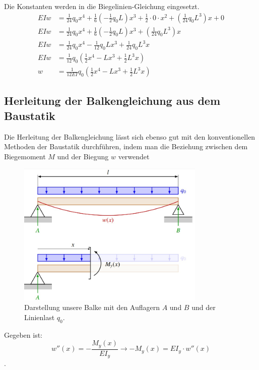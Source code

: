 Die Konstanten werden in die Biegelinien-Gleichung eingesetzt.
\begin{align}
	EIw&=
	\frac{1}{24}q_0x^4+\frac{1}{6}\left(-\frac{1}{2}q_0L\right)x^3+\frac{1}{2}\cdot0\cdot x^2+\left(\frac{1}{24}q_0L^3\right)x+0
  \\
	EIw&=
	\frac{1}{24}q_0x^4+\frac{1}{6}\left(-\frac{1}{2}q_0L\right)x^3+\left(\frac{1}{24}q_0L^3\right)x
	\\
	EIw&=
	\frac{1}{24}q_0x^4-\frac{1}{12}q_0Lx^3+\frac{1}{24}q_0L^3x
	\\
	EIw&=
	\frac{1}{12}q_0\left(\frac{1}{2}x^4-Lx^3+\frac{1}{2}L^3x\right)
	\\
	w&=
	\frac{1}{12EI}q_0\left(\frac{1}{2}x^4-Lx^3+\frac{1}{2}L^3x\right)
\end{align}

\subsection{Herleitung der Balkengleichung aus dem Baustatik}
Die Herleitung der Balkengleichung lässt sich ebenso gut mit den konventionellen Methoden der Baustatik durchführen, indem man die Beziehung zwischen dem Biegemoment $M$ und der Biegung $w$ verwendet
\begin{figure}
\begin{center}
	\includegraphics[width=0.8\textwidth]{papers/balken/images/teil2/HerleitungBaustatik.jpg}
\end{center}
\caption{Darstellung unsere Balke mit den Auflagern $A$ und $B$ und der Linienlast $q_0$.}
\end{figure}
Gegeben ist:
\begin{equation}
	w''(x)=
	-\frac{M_y(x)}{EI_y}
	\rightarrow-M_y(x)=
	EI_y\cdot w''(x)
\end{equation}.
